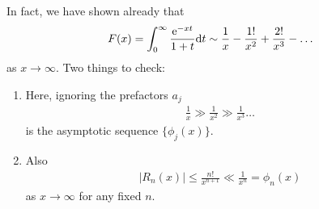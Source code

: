 In fact, we have shown already that
\begin{gather*}
	F(x) = \int_{0}^{\infty} \frac{\mathrm{e}^{-xt}}{1+t} \mathrm{d} t \sim \frac{1}{x} - \frac{1!}{x^2} + \frac{2!}{x^3} - \dots
\end{gather*}
as $x \rightarrow \infty$. Two things to check:
\begin{enumerate}
	\item Here, ignoring the prefactors $a_j$
	\begin{gather*}
		\frac{1}{x} \gg \frac{1}{x^2} \gg \frac{1}{x^3} \dots
	\end{gather*}
	is the asymptotic sequence $\{\phi_j(x)\}$.
	\item Also
	\begin{gather*}
		|R_n(x)| \leq \frac{n!}{x^{n+1}} \ll \frac{1}{x^n} = \phi_n(x)
	\end{gather*}
	as $x \rightarrow \infty$ for any fixed $n$.
\end{enumerate}

